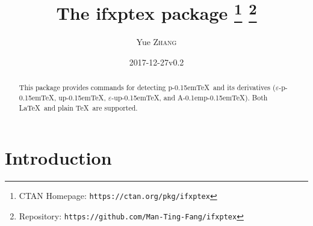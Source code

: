\documentclass[a4paper]{article}
\newcommand\NormalSans{\normalfont\sffamily}
\newcommand\pkg[1]{{\protect\NormalSans#1}}
\newcommand\pTeX{p\kern-0.15em\TeX}
\newcommand\e{\ensuremath{\varepsilon}}
\newcommand\epTeX{\e-\pTeX}
\newcommand\upTeX{u\pTeX}
\newcommand\eupTeX{\e-\upTeX}
\newcommand\ApTeX{A\kern-0.1em\pTeX}
\begin{document}
\title{The \pkg{ifxptex} package%
  \thanks{CTAN Homepage: \texttt{https://ctan.org/pkg/ifxptex}}
  \thanks{Repository: \texttt{https://github.com/Man-Ting-Fang/ifxptex}}}
\author{Yue \textsc{Zhang}}
\date{2017-12-27\quad v0.2}

\maketitle

\begin{abstract}
This package provides commands for detecting \pTeX\ and its derivatives (\epTeX,
\upTeX, \eupTeX, and \ApTeX). Both \LaTeX\ and plain \TeX\ are supported.
\end{abstract}

\section{Introduction}
\end{document}
